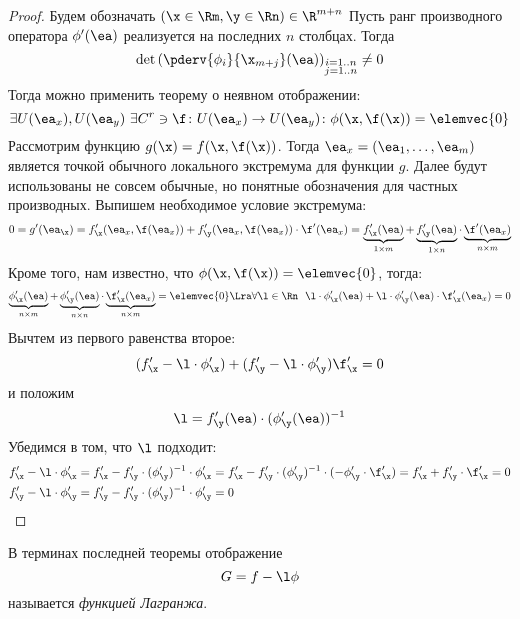 \begin{proof}
    Будем обозначать $(\x \in \Rm, \y \in \Rn) \in \R^{m + n}$
    Пусть ранг производного оператора $\phi'(\ea)$ реализуется на
    последних $n$ столбцах. Тогда
\[
    \det{\left( \pderv{\phi_i}{\x_{m + j}}(\ea) \right)}_{\substack{i = 1..n
    \\ j = 1..n}} \neq 0
\]
    Тогда можно применить теорему о неявном отображении:
\[
    \exists U(\ea_x), U(\ea_y)~ \exists C^r \ni \f \colon U(\ea_x) \to U(\ea_y)
    \colon \phi(\x, \f(\x)) = \elemvec{0}
\]
    Рассмотрим функцию $g(\x) = f(\x, \f(\x))$. Тогда $\ea_x = (\ea_1, \ldots, \ea_m)$
    является точкой обычного локального экстремума для функции $g$. Далее будут
    использованы не совсем обычные, но понятные обозначения для частных производных.
    Выпишем необходимое условие экстремума:
\[
    0 = g'(\ea_\x) = f'_{\x}(\ea_x, \f(\ea_x)) + f'_{\y}(\ea_x, \f(\ea_x)) \cdot \f'(\ea_x) =
    \underbrace{f'_{\x}(\ea)}_{1 \times m} + \underbrace{f'_{\y}(\ea)}_{1 \times n}
    \cdot \underbrace{\f'(\ea_x)}_{n \times m}
\]
    Кроме того, нам известно, что $\phi(\x, \f(\x)) = \elemvec{0}$, тогда:
\[
    \underbrace{\phi'_{\x}(\ea)}_{n \times m} + \underbrace{\phi'_{\y}(\ea)}_{n \times n}
    \cdot \underbrace{\f'_{\x}(\ea_x)}_{n \times m} = \elemvec{0} \Lra
    \forall \l \in \Rn~~ \l \cdot \phi'_{\x}(\ea) + \l \cdot \phi'_{\y}(\ea) \cdot
    \f'_{\x}(\ea_x) = 0
\]
    Вычтем из первого равенства второе:
\[
    (f'_{\x} - \l \cdot \phi'_{\x}) + (f'_{\y} - \l \cdot \phi'_{\y}) \f'_{\x} = 0
\]
    и положим
\[
    \l = f'_{\y}(\ea) \cdot (\phi'_{\y}(\ea))^{-1}
\]
    Убедимся в том, что $\l$ подходит:
\begin{align*}
    f'_{\x} - \l \cdot \phi'_{\x} &= f'_{\x} - f'_{\y} \cdot (\phi'_{\y})^{-1}
    \cdot \phi'_{\x} = f'_{\x} - f'_{\y} \cdot (\phi'_{\y})^{-1} \cdot (-\phi'_{\y}
    \cdot \f'_{\x}) = f'_{\x} + f'_{\y} \cdot \f'_{\x} = 0 \\
    f'_{\y} - \l \cdot \phi'_{\y} &= f'_{\y} - f'_{\y} \cdot (\phi'_{\y})^{-1}
    \cdot \phi'_{\y} = 0
\end{align*}
\end{proof}

\begin{definition}
    В терминах последней теоремы отображение
\[
    G = f - \l \phi
\]
    называется \textit{функцией Лагранжа}.
\end{definition}

